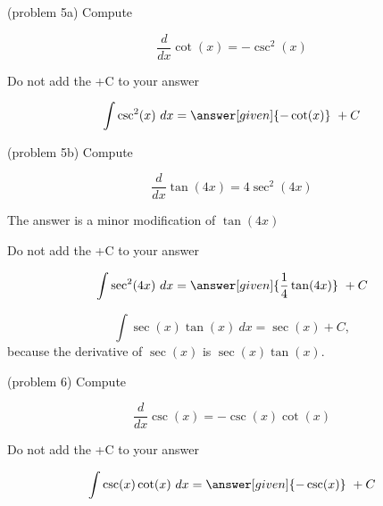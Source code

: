 \documentclass{ximera}
\begin{document}
\begin{problem}(problem 5a)
Compute 

\begin{hint}
\[
\frac{d}{dx} \cot(x) = -\csc^2(x)
\]
\end{hint}
\begin{hint}
\begin{center}
Do not add the +C to your answer
\end{center}
\end{hint}

\[
\int \csc^2(x) \ dx =
\answer[given]{-\cot(x)} \ + C
\]
\end{problem}

\begin{problem}(problem 5b)
Compute 

\begin{hint}
\[
\frac{d}{dx} \tan(4x) = 4\sec^2(4x)
\]
\end{hint}
\begin{hint}
The answer is a minor modification of $\tan(4x)$
\end{hint}
\begin{hint}
\begin{center}
Do not add the +C to your answer
\end{center}
\end{hint}

\[
\int \sec^2(4x) \ dx =
\answer[given]{\frac14\tan(4x)} \ + C
\]
\end{problem}

\begin{example}[example 6]
\[
\int \sec(x)\tan(x) \ dx = \sec(x) + C,
\]
because the derivative of $\sec(x)$ is $\sec(x)\tan(x)$.

\end{example}


\begin{problem}(problem 6)
Compute 

\begin{hint}
\[
\frac{d}{dx} \csc(x) = -\csc(x)\cot(x)
\]
\end{hint}
\begin{hint}
\begin{center}
Do not add the +C to your answer
\end{center}
\end{hint}

\[
\int \csc(x)\cot(x) \ dx =
\answer[given]{-\csc(x)} \ + C
\]
\end{problem}
\end{document}
